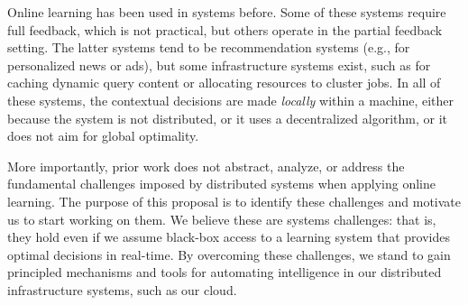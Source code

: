 \documentclass[letterpaper,twocolumn]{article}
\newcommand{\ignore}[1]{}
\begin{document}

Online learning has been used in systems before. Some of these systems require
full feedback, which is not practical, but others operate in the partial
feedback setting.  The latter systems tend to be recommendation systems (e.g.,
for personalized news or ads), but some infrastructure systems exist, such as
for caching dynamic query content or allocating resources to
cluster jobs.  In all of these systems, the contextual decisions are made {\em
locally} within a machine, either because the system is not distributed, or it
uses a decentralized algorithm, or it does not aim for global optimality.
\ignore{We are not aware of any system that makes ``global'' decisions based on truly
distributed architecture or state.}

\ignore{
Machine learning has certainly been used in the past to optimize system
decisions. Most of this use has been restricted to either offline settings or
expect {\em full feedback}, whereby a supervised learner is trained on data
that has been annotated with correct labels.
Some systems work in an online setting with full feedback. An example of that
is a caching layer that uses a learning system to dynamically switch between
existing (hand-designed) cache eviction policies, by running all policies in
parallel and measuring their performance.
Systems that work in an online setting with partial feedback
tend to be for news or ad recommendation, but examples from systems
infrastructure exist. For example, caching dynamic query content [], tuning
parameters of multicore data structures [], allocating resources to cluster
computing tasks [], and allocating servers to web applications [].  In all of
these systems, the context used to make a decision, and the decision itself, are
{\em local} to a machine. This is achieved by either devising a decentralized
algorithm in the first place, or giving up on global optimality. We are not
aware of any system that makes ``global'' decisions based on truly distributed
architecture or state.
}


More importantly, prior work does not abstract, analyze, or address the
fundamental challenges imposed by distributed systems when applying online
learning.  The purpose of this proposal is to identify these challenges and
motivate us to start working on them.  We believe these are systems
challenges: that is, they hold even if we assume black-box access to a
learning system that provides optimal decisions in real-time. By overcoming
these challenges, we stand to gain principled mechanisms and tools for
automating intelligence in our distributed infrastructure systems, such as our
cloud.
\end{document}
